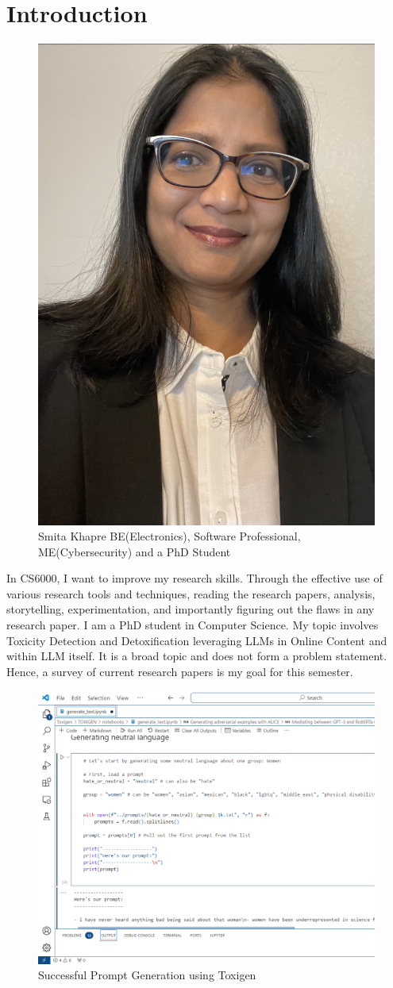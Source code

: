 
\section{Introduction}
\begin{figure}[h]
\centering
\includegraphics[width=0.35\linewidth]{images/snap.jpg}
\caption{\label{fig:Smita}Smita Khapre BE(Electronics), Software Professional, ME(Cybersecurity) and a PhD Student}
\end{figure}

In CS6000, I want to improve my research skills. Through the effective use of various research tools and techniques, reading the research papers, analysis, storytelling, experimentation, and importantly figuring out the flaws in any research paper. I am a PhD student in Computer Science. My topic involves Toxicity Detection and Detoxification leveraging LLMs in Online Content and within LLM itself. It is a broad topic and does not form a problem statement. Hence, a survey of current research papers is my goal for this semester. 
\begin{figure}
    \centering
    \includegraphics[width=1\linewidth]{images/Toxigen_prompt_generation_GPT.png}
    \caption{Successful Prompt Generation using Toxigen}
    \label{fig:Tox_gen}
\end{figure}

